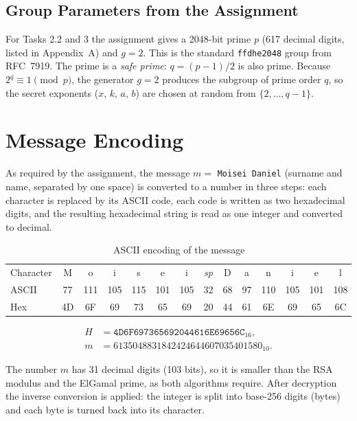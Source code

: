 \documentclass[12pt,a4paper]{article}
\begin{document}
\subsection{Group Parameters from the Assignment}

For Tasks 2.2 and 3 the assignment gives a 2048-bit prime $p$ (617 decimal digits, listed in Appendix~A) and $g = 2$. This is the standard \texttt{ffdhe2048} group from RFC~7919. The prime is a \emph{safe prime}: $q = (p-1)/2$ is also prime. Because $2^q \equiv 1 \pmod p$, the generator $g = 2$ produces the subgroup of prime order $q$, so the secret exponents ($x$, $k$, $a$, $b$) are chosen at random from $\{2, \ldots, q-1\}$.

\newpage
\section{Message Encoding}

As required by the assignment, the message $m = $ \texttt{Moisei Daniel} (surname and name, separated by one space) is converted to a number in three steps: each character is replaced by its ASCII code, each code is written as two hexadecimal digits, and the resulting hexadecimal string is read as one integer and converted to decimal.

\begin{table}[H]
  \centering
  \caption{ASCII encoding of the message}
  \renewcommand{\arraystretch}{1.2}
  \setlength{\tabcolsep}{4.2pt}
  \begin{tabular}{l*{13}{c}}
    \toprule
    Character & M & o & i & s & e & i & \textit{sp} & D & a & n & i & e & l \\
    ASCII     & 77 & 111 & 105 & 115 & 101 & 105 & 32 & 68 & 97 & 110 & 105 & 101 & 108 \\
    Hex       & 4D & 6F & 69 & 73 & 65 & 69 & 20 & 44 & 61 & 6E & 69 & 65 & 6C \\
    \bottomrule
  \end{tabular}
\end{table}

\begin{align}
  H &= \texttt{4D6F697365692044616E69656C}_{16}, \\
  m &= 6135048831842424644607035401580_{10}.
\end{align}

The number $m$ has 31 decimal digits (103 bits), so it is smaller than the RSA modulus and the ElGamal prime, as both algorithms require. After decryption the inverse conversion is applied: the integer is split into base-256 digits (bytes) and each byte is turned back into its character.
\end{document}
